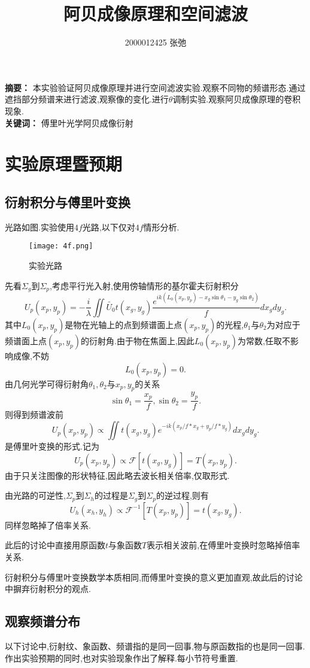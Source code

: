 \documentclass[10pt]{ctexart}
\author{2000012425 张弛}
\title{阿贝成像原理和空间滤波}
\begin{document}
\maketitle
\noindent\textbf{摘\quad 要：}
本实验验证阿贝成像原理并进行空间滤波实验.观察不同物的频谱形态.通过遮挡部分频谱来进行滤波,观察像的变化.进行$\theta$调制实验.观察阿贝成像原理的卷积现象.\\
\noindent\textbf{关键词：}
傅里叶光学\quad 阿贝成像\quad 衍射
\section{实验原理暨预期}
\subsection{衍射积分与傅里叶变换}
光路如图.实验使用$4f$光路,以下仅对$4f$情形分析.
\begin{figure}[H]
\centering
\texttt{[image: 4f.png]}
\caption{实验光路}
\end{figure}
先看$\Sigma_g$到$\Sigma_p$,考虑平行光入射,使用傍轴情形的基尔霍夫衍射积分
$$U_p(x_p,y_p)=-\frac{i}{\lambda}\iint \widetilde{U_0}t(x_g,y_g)\frac{e^{ik(L_0(x_p,y_p)-x_g\sin{\theta_1}-y_g\sin{\theta_2})}}{f}dx_gdy_g.$$
其中$L_0(x_p,y_p)$是物在光轴上的点到频谱面上点$(x_p,y_p)$的光程,$\theta_1$与$\theta_2$为对应于频谱面上点$(x_p,y_p)$的衍射角.由于物在焦面上,因此$L_0(x_p,y_p)$为常数,任取不影响成像,不妨
$$L_0(x_p,y_p)=0.$$
由几何光学可得衍射角$\theta_1,\theta_2$与$x_p,y_p$的关系
$$\sin{\theta_1}=\frac{x_p}{f},\sin{\theta_2}=\frac{y_p}{f}.$$
则得到频谱波前
$$U_p(x_p,y_p)\propto \iint t(x_g,y_g)e^{-ik(x_p/f*x_g+y_p/f*y_g)}dx_gdy_g.$$
是傅里叶变换的形式.记为
$$U_p(x_p,y_p)\propto \mathcal{F}[t(x_g,y_g)]=T(x_p,y_p).$$
由于只关注图像的形状特征,因此略去波长相关倍率,仅取形式.

由光路的可逆性,$\Sigma_p$到$\Sigma_h$的过程是$\Sigma_g$到$\Sigma_p$的逆过程,则有
$$U_h(x_h,y_h)\propto \mathcal{F}^{-1}[T(x_p,y_p)]=t(x_g,y_g).$$
同样忽略掉了倍率关系.

此后的讨论中直接用原函数$t$与象函数$T$表示相关波前,在傅里叶变换时忽略掉倍率关系.

衍射积分与傅里叶变换数学本质相同,而傅里叶变换的意义更加直观,故此后的讨论中摒弃衍射积分的观点.
\subsection{观察频谱分布}
以下讨论中,衍射纹、象函数、频谱指的是同一回事,物与原函数指的也是同一回事.作出实验预期的同时,也对实验现象作出了解释.每小节符号重置.
\end{document}
